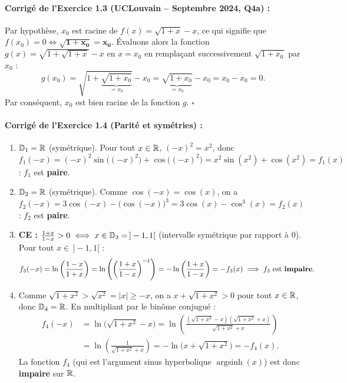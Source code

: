 \paragraph{Corrigé de l'Exercice 1.3 (UCLouvain -- Septembre 2024, Q4a) :}
Par hypothèse, $x_0$ est racine de $f(x) = \sqrt{1+x} - x$, ce qui signifie que $f(x_0) = 0 \iff \mathbf{\sqrt{1 + x_0} = x_0}$.
Évaluons alors la fonction $g(x) = \sqrt{1 + \sqrt{1+x}} - x$ en $x = x_0$ en remplaçant successivement $\sqrt{1+x_0}$ par $x_0$ :
\[
    g(x_0) = \sqrt{1 + \underbrace{\sqrt{1 + x_0}}_{= x_0}} - x_0 = \underbrace{\sqrt{1 + x_0}}_{= x_0} - x_0 = x_0 - x_0 = 0.
\]
Par conséquent, $x_0$ est bien racine de la fonction $g$. \hfill $\square$

\paragraph{Corrigé de l'Exercice 1.4 (Parité et symétries) :}
\begin{enumerate}[label=(\alph*)]
    \item $\mathbb{D}_1 = \mathbb{R}$ (symétrique). Pour tout $x \in \mathbb{R}$, $(-x)^2 = x^2$, donc $f_1(-x) = (-x)^2\sin\bigl((-x)^2\bigr) + \cos\bigl((-x)^2\bigr) = x^2\sin(x^2) + \cos(x^2) = f_1(x)$ : $f_1$ est \textbf{paire}.
    \item $\mathbb{D}_2 = \mathbb{R}$ (symétrique). Comme $\cos(-x) = \cos(x)$, on a $f_2(-x) = 3\cos(-x) - \bigl(\cos(-x)\bigr)^3 = 3\cos(x) - \cos^3(x) = f_2(x)$ : $f_2$ est \textbf{paire}.
    \item \textbf{CE :} $\frac{1+x}{1-x} > 0 \iff x \in \mathbb{D}_3 = \,]-1, 1[$ (intervalle symétrique par rapport à $0$). Pour tout $x \in \,]-1, 1[$ :
    \[
        f_3(-x) = \ln\left(\frac{1-x}{1+x}\right) = \ln\left(\left(\frac{1+x}{1-x}\right)^{-1}\right) = -\ln\left(\frac{1+x}{1-x}\right) = -f_3(x) \implies f_3 \text{ est \textbf{impaire}}.
    \]
    \item Comme $\sqrt{1+x^2} > \sqrt{x^2} = |x| \ge -x$, on a $x + \sqrt{1+x^2} > 0$ pour tout $x \in \mathbb{R}$, donc $\mathbb{D}_4 = \mathbb{R}$. En multipliant par le binôme conjugué :
    \begin{align*}
        f_4(-x) &= \ln\bigl(\sqrt{1+x^2} - x\bigr) = \ln\left(\frac{(\sqrt{1+x^2}-x)(\sqrt{1+x^2}+x)}{\sqrt{1+x^2}+x}\right) \\
        &= \ln\left(\frac{1}{\sqrt{1+x^2}+x}\right) = -\ln\bigl(x + \sqrt{1+x^2}\bigr) = -f_4(x).
    \end{align*}
    La fonction $f_4$ (qui est l'argument sinus hyperbolique $\operatorname{argsinh}(x)$) est donc \textbf{impaire} sur $\mathbb{R}$.
\end{enumerate}

